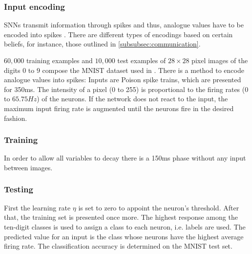 \subsubsection{Input encoding}
\acp{SNN} transmit information through spikes and thus, analogue values have to be encoded into spikes \cite{DIET_SNN}.
There are different types of encodings based on certain beliefs, 
for instance, those outlined in \autoref{subsubsec:communication}.

$60,000$ training examples and $10,000$ test examples of $28\times 28$ pixel images of the digits 0 to 9 compose the MNIST dataset used in 
\cite{SNN,ANN_SNN_conversion,RBM_SNN}.
There is a method to encode analogue values into spikes:
Inputs are Poison spike trains, which are presented for 350ms.
The intensity of a pixel (0 to 255) is proportional to the firing rates (0 to $65.75 Hz$) of the neurons.
If the network does not react to the input, the maximum input firing rate is augmented until the neurons fire in the desired fashion. 


\subsubsection{Training}
In order to allow all variables to decay there is a 150ms phase without any input between images.

\subsubsection{Testing}
First the learning rate $\eta$ is set to zero to appoint the neuron's threshold.
After that, the training set is presented once more.
The highest response among the ten-digit classes is used to assign a class to each neuron, i.e. labels are used.
The predicted value for an input is the class whose neurons have the highest average firing rate.
The classification accuracy is determined on the MNIST test set.